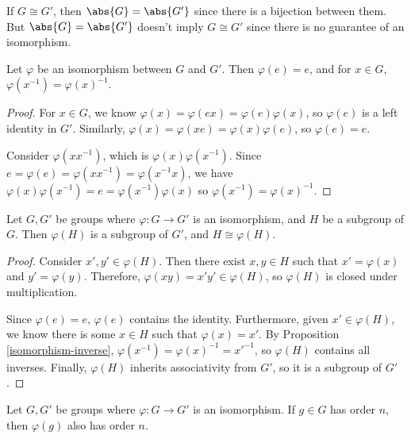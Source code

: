 \documentclass[12pt]{article}
\begin{document}
\begin{rmk}
    If $G \cong G'$, then $\abs{G} = \abs{G'}$ since there is a bijection between them. But $\abs{G} = \abs{G'}$ doesn't imply $G \cong G'$ since there is no guarantee of an isomorphism.
\end{rmk}

\begin{prop}\label{isomorphism-preserves-identity-inverses}
    Let $\varphi$ be an isomorphism between $G$ and $G'$. Then $\varphi(e) = e$, and for $x \in G$, $\varphi(x^{-1}) = \varphi(x)^{-1}$.
\end{prop}

\begin{proof}
    For $x \in G$, we know $\varphi(x) = \varphi(ex) = \varphi(e)\varphi(x)$, so $\varphi(e)$ is a left identity in $G'$. Similarly, $\varphi(x) = \varphi(xe) = \varphi(x)\varphi(e)$, so $\varphi(e) = e$.

    Consider $\varphi(xx^{-1})$, which is $\varphi(x)\varphi(x^{-1})$. Since $e = \varphi(e) = \varphi(xx^{-1}) = \varphi(x^{-1}x)$, we have $\varphi(x)\varphi(x^{-1}) = e = \varphi(x^{-1})\varphi(x)$ so $\varphi(x^{-1}) = \varphi(x)^{-1}$.
\end{proof}

\begin{prop}\label{isomorphism-subgroups}
    Let $G, G'$ be groups where $\varphi: G \to G'$ is an isomorphism, and $H$ be a subgroup of $G$. Then $\varphi(H)$ is a subgroup of $G'$, and $H \cong \varphi(H)$.
\end{prop}

\begin{proof}
    Consider $x', y' \in \varphi(H)$. Then there exist $x, y \in H$ such that $x' = \varphi(x)$ and $y' = \varphi(y)$. Therefore, $\varphi(xy) = x'y' \in \varphi(H)$, so $\varphi(H)$ is closed under multiplication.

    Since $\varphi(e) = e$, $\varphi(e)$ contains the identity. Furthermore, given $x' \in \varphi(H)$, we know there is some $x \in H$ such that $\varphi(x) = x'$. By Proposition \ref{isomorphism-inverse}, $\varphi(x^{-1}) = \varphi(x)^{-1} = x'^{-1}$, so $\varphi(H)$ contains all inverses. Finally, $\varphi(H)$ inherits associativity from $G'$, so it is a subgroup of $G'$.
\end{proof}

\begin{prop}
    Let $G, G'$ be groups where $\varphi: G \to G'$ is an isomorphism. If $g \in G$ has order $n$, then $\varphi(g)$ also has order $n$.
\end{prop}
\end{document}
